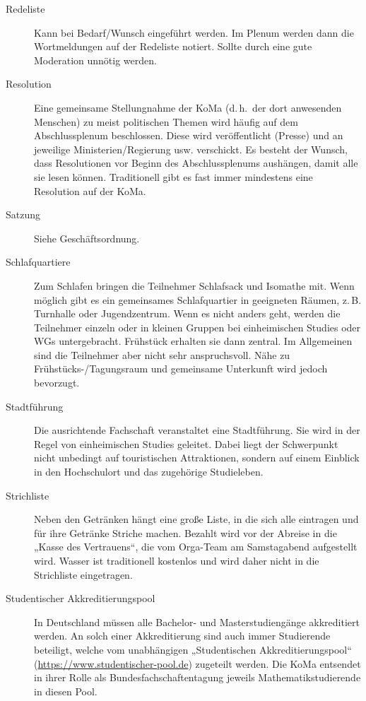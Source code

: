\documentclass{neulingsheft}
\begin{document}
{\begin{description}
\item[Redeliste] Kann bei Bedarf/Wunsch eingeführt werden. Im Plenum werden
	dann die Wortmeldungen auf der Redeliste notiert. Sollte durch eine gute
	Moderation unnötig werden.

\item[Resolution] Eine gemeinsame Stellungnahme der KoMa (d.\,h.\ der dort
	anwesenden Menschen) zu meist politischen Themen wird häufig auf dem
	Abschlussplenum beschlossen.  Diese wird veröffentlicht (Presse) und an
	jeweilige Ministerien/Regierung usw. verschickt. Es besteht der Wunsch,
	dass Resolutionen vor Beginn des Abschlussplenums aushängen, damit alle sie
	lesen können. Traditionell gibt es fast immer mindestens eine Resolution
	auf der KoMa.

\item[Satzung] Siehe Geschäftsordnung.

\item[Schlafquartiere] Zum Schlafen bringen die Teilnehmer Schlafsack und
	Isomathe mit. Wenn möglich gibt es ein gemeinsames Schlafquartier in
	geeigneten Räumen, z.\,B. Turnhalle oder Jugendzentrum. Wenn es nicht
	anders geht, werden die Teilnehmer einzeln oder in kleinen Gruppen bei
	einheimischen Studies oder WGs untergebracht. Frühstück erhalten sie dann
	zentral. Im Allgemeinen sind die Teilnehmer aber nicht sehr anspruchsvoll.
	Nähe zu Frühstücks-/Tagungsraum und gemeinsame Unterkunft wird jedoch
	bevorzugt.

\item[Stadtführung] Die ausrichtende Fachschaft veranstaltet eine Stadtführung.
	Sie wird in der Regel von einheimischen Studies geleitet. Dabei liegt der
	Schwerpunkt nicht unbedingt auf touristischen Attraktionen, sondern auf
	einem Einblick in den Hochschulort und das zugehörige Studieleben.

\item[Strichliste] Neben den Getränken hängt eine große Liste, in die sich alle
	eintragen und für ihre Getränke Striche machen.  Bezahlt wird vor der
	Abreise in die „Kasse des Vertrauens“, die vom Orga-Team am Samstagabend
	aufgestellt wird.  Wasser ist traditionell kostenlos und wird daher nicht
	in die Strichliste eingetragen.

\item[Studentischer Akkreditierungspool] In Deutschland müssen alle Bachelor-
	und Masterstudiengänge akkreditiert werden. An solch einer Akkreditierung
	sind auch immer Studierende beteiligt, welche vom unabhängigen
	„Studentischen Akkreditierungspool“
	(\url{https://www.studentischer-pool.de}) zugeteilt werden. Die KoMa
	entsendet in ihrer Rolle als Bundesfachschaftentagung jeweils
	Mathematikstudierende in diesen Pool.


\end{description}}
\end{document}
